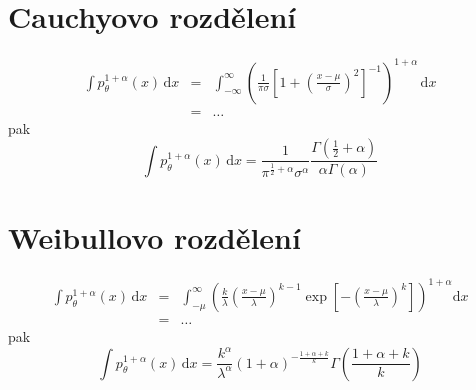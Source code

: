 \documentclass[11pt]{article}
\newcommand{\intpa}{\int p_\theta^{1+\alpha}(x) \, \mathrm{d}x }
\begin{document}
\section{Cauchyovo rozdělení}

\begin{eqnarray}
\intpa & = & \int_{-\infty }^{\infty } \left( \frac{1}{\pi \sigma} \left[ 1 + \left( \frac{x - \mu}{\sigma} \right) ^2 \right]^{-1} \right)^{1+\alpha} \, \mathrm{d}x \nonumber\\
& = & \ldots \nonumber
\end{eqnarray} 
pak
\begin{equation}
\intpa = \frac{1}{\pi^{\frac{1}{2}+\alpha}\sigma^\alpha} \frac{\Gamma(\frac{1}{2} + \alpha)}{\alpha\Gamma(\alpha)}
\end{equation}

\section{Weibullovo rozdělení}

\begin{eqnarray}
\intpa & = & \int_{-\mu }^{\infty } \left( \frac{k}{\lambda} \left( \frac{x-\mu}{\lambda} \right)^{k-1} \exp \left[ -\left( \frac{x-\mu}{\lambda} \right)^k \right] \right)^{1+\alpha} \mathrm{d}x \nonumber\\
& = & \ldots \nonumber
\end{eqnarray} 
pak
\begin{equation}
\intpa = \frac{k^\alpha}{\lambda^\alpha}(1+\alpha)^{-\frac{1+\alpha +k}{k}} \Gamma \left( \frac{1+\alpha +k}{k}\right)
\end{equation}
\end{document}

